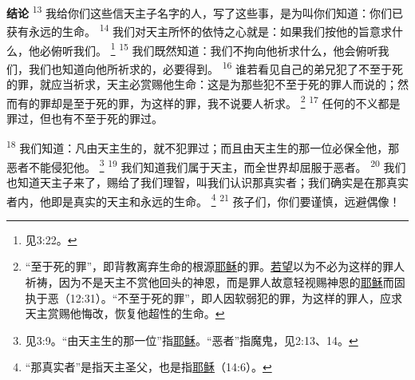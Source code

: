 \begin{multicols}{2}
\textbf{结论\quad}
\textsuperscript{13}
我给你们这些信天主子名字的人，写了这些事，是为叫你们知道：你们已获有永远的生命。
\textsuperscript{14}
我们对天主所怀的依恃之心就是：如果我们按他的旨意求什么，他必俯听我们。
\footnote{见3:22。}
\textsuperscript{15}
我们既然知道：我们不拘向他祈求什么，他会俯听我们，我们也知道向他所祈求的，必要得到。
\textsuperscript{16}
谁若看见自己的弟兄犯了不至于死的罪，就应当祈求，天主必赏赐他生命：这是为那些犯不至于死的罪人而说的；然而有的罪却是至于死的罪，为这样的罪，我不说要人祈求。
\footnote{“至于死的罪”，即背教离弃生命的根源\uline{耶稣}的罪。\uline{若望}以为不必为这样的罪人祈祷，因为不是天主不赏他回头的神恩，而是罪人故意轻视赐神恩的\uline{耶稣}而固执于恶（12:31）。“不至于死的罪”，即人因软弱犯的罪，为这样的罪人，应求天主赏赐他悔改，恢复他超性的生命。}
\textsuperscript{17}
任何的不义都是罪过，但也有不至于死的罪过。

\textsuperscript{18}
我们知道：凡由天主生的，就不犯罪过；而且由天主生的那一位必保全他，那恶者不能侵犯他。
\footnote{见3:9。“由天主生的那一位”指\uline{耶稣}。“恶者”指魔鬼，见2:13、14。}
\textsuperscript{19}
我们知道我们属于天主，而全世界却屈服于恶者。
\textsuperscript{20}
我们也知道天主子来了，赐给了我们理智，叫我们认识那真实者；我们确实是在那真实者内，他即是真实的天主和永远的生命。
\footnote{“那真实者”是指天主圣父，也是指\uline{耶稣}（14:6）。}
\textsuperscript{21}
孩子们，你们要谨慎，远避偶像！

\end{multicols}